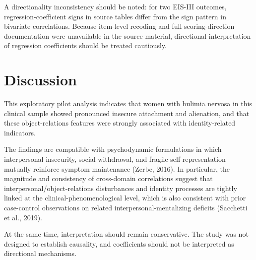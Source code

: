 \documentclass[12pt]{article}
\begin{document}
\begin{table}[htbp]
\centering
\caption{Regression coefficients for EIS-III outcomes predicted by BORI domains}
\label{tab:regression}
\small
{}
\end{table}

A directionality inconsistency should be noted: for two EIS-III outcomes, regression-coefficient signs in source tables differ from the sign pattern in bivariate correlations. Because item-level recoding and full scoring-direction documentation were unavailable in the source material, directional interpretation of regression coefficients should be treated cautiously.

\section{Discussion}
This exploratory pilot analysis indicates that women with bulimia nervosa in this clinical sample showed pronounced insecure attachment and alienation, and that these object-relations features were strongly associated with identity-related indicators.

The findings are compatible with psychodynamic formulations in which interpersonal insecurity, social withdrawal, and fragile self-representation mutually reinforce symptom maintenance (Zerbe, 2016). In particular, the magnitude and consistency of cross-domain correlations suggest that interpersonal/object-relations disturbances and identity processes are tightly linked at the clinical-phenomenological level, which is also consistent with prior case-control observations on related interpersonal-mentalizing deficits (Sacchetti et al., 2019).

At the same time, interpretation should remain conservative. The study was not designed to establish causality, and coefficients should not be interpreted as directional mechanisms.
\end{document}
